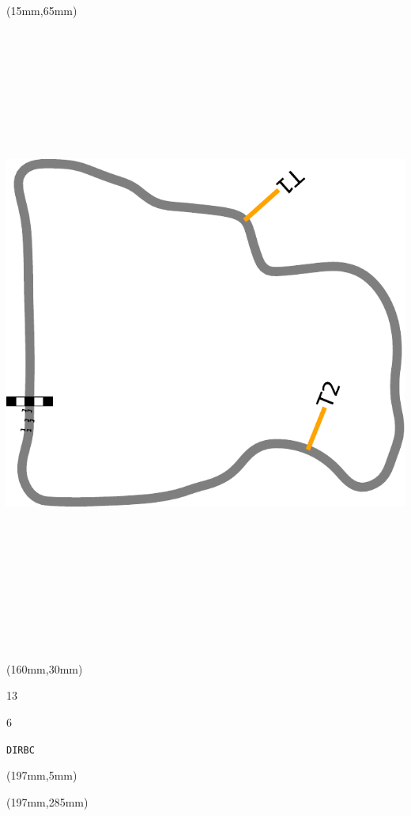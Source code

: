 \begin{textblock*}{185mm}(15mm,65mm)%
\centering
\mbox{\includegraphics[width=185mm,height=210mm,keepaspectratio]{PT/DIRBC.pdf}}
\end{textblock*}
\begin{textblock*}{40mm}(160mm,30mm)%
\Large
\par{} 
\par13 
\par6 
\par\hfill\tiny\tt DIRBC\\
\end{textblock*}
\begin{textblock*}{20mm}(197mm,5mm)%
\fbox{\thepage}
\label{DIRBC}
\end{textblock*}
\begin{textblock*}{20mm}(197mm,285mm)%
\fbox{\thepage}
\end{textblock*}

